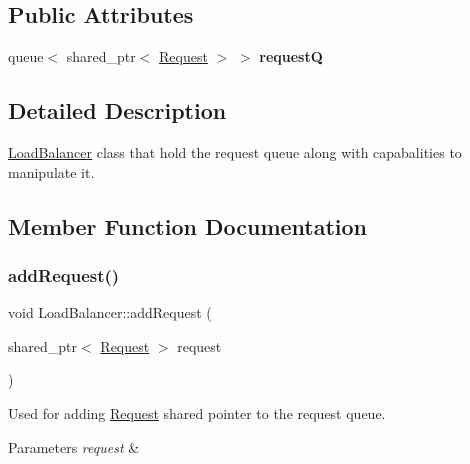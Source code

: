 \subsection*{Public Attributes}
\begin{DoxyCompactItemize}
\item 
\mbox{\label{classLoadBalancer_a40a5b5f052758a9dd98b6e3d293cb831}} 
queue$<$ shared\+\_\+ptr$<$ \hyperlink{classRequest}{Request} $>$ $>$ {\bfseries requestQ}
\end{DoxyCompactItemize}


\subsection{Detailed Description}
\hyperlink{classLoadBalancer}{Load\+Balancer} class that hold the request queue along with capabalities to manipulate it. 

\subsection{Member Function Documentation}
\mbox{\label{classLoadBalancer_a2efdf7d7e22b78a284eb0031b109f0b0}} 
\subsubsection{\texorpdfstring{add\+Request()}{addRequest()}}
{\footnotesize\ttfamily void Load\+Balancer\+::add\+Request (\begin{DoxyParamCaption}\item[{shared\+\_\+ptr$<$ \hyperlink{classRequest}{Request} $>$}]{request }\end{DoxyParamCaption})\hspace{0.3cm}{\ttfamily [inline]}}



Used for adding \hyperlink{classRequest}{Request} shared pointer to the request queue. 


\begin{DoxyParams}{Parameters}
{\em request} & \\
\hline
\end{DoxyParams}
\mbox{\label{classLoadBalancer_aa79b2225c613810e695c2b07b38e93c2}} 
